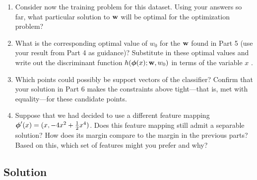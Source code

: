 \documentclass[submit]{harvardml}
\begin{document}
\begin{problem}
\begin{enumerate}
\item Consider now the training problem for this dataset. Using your
  answers so far, what particular solution to $\mathbf{w}$ will be optimal
  for the optimization problem?

\item What is the corresponding optimal value of $w_0$ for the
  $\mathbf{w}$ found in Part 5 (use your result from Part 4 as guidance)?
  Substitute in these optimal values and write out the discriminant
  function $h(\boldsymbol{\phi}(x);\mathbf{w},w_0)$ in terms of the variable $x$ .


\item Which points could possibly be support vectors of the classifier?  Confirm that
  your solution in Part 6 makes the constraints above tight---that is,
  met with equality---for these candidate points.

\item Suppose that we had decided to use a different feature mapping
    $\boldsymbol{\phi}'(x) = (x, -4x^2 + \frac{1}{2}x^4 )$.  Does
    this feature mapping still admit a separable solution?  How does
    its margin compare to the margin in the previous parts?  Based on
    this, which set of features might you prefer and why? 
    
\end{enumerate}

\end{problem}

\subsection*{Solution}
\end{document}
